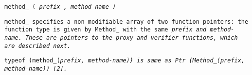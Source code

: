 
\tt{method_ (} \it{prefix} \tt{,} \it{method-name} \tt{)}


\tt{method_} specifies a non-modifiable array of
two function pointers: the function type is given by
\tt{Method_} with the same \it{prefix} and \it{method-name}.
These are pointers to the proxy and verifier functions, which are described next.

\note \tt{typeof (method_(}\it{prefix}\tt{,} \it{method-name}\tt{))} is
same as \tt{Ptr (Method_(}\it{prefix}\tt{,} \it{method-name}\tt{)) [2]}.
